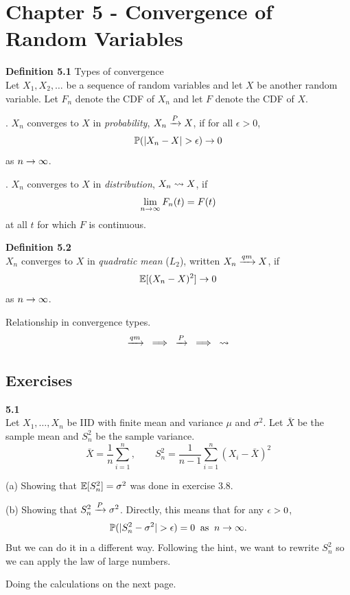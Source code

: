 
\newpage
\section{Chapter 5 - Convergence of Random Variables}

\medskip\noindent\textbf{Definition 5.1} Types of convergence\\
Let $X_1,X_2,\ldots$ be a sequence of random variables and let $X$ be another
random variable. Let $F_n$ denote the CDF of $X_n$ and let $F$ denote the CDF of $X$.

\medskip{}. $X_n$ converges to $X$ in \emph{probability}, $X_n\xrightarrow{P} X$, if for all $\epsilon > 0$,
$$
\mathbb{P}(|X_n - X| > \epsilon)\rightarrow 0
$$
as $n\rightarrow\infty$.

\medskip{}. $X_n$ converges to $X$ in \emph{distribution}, $X_n\rightsquigarrow X$, if
$$
\lim_{n\rightarrow\infty}F_n(t) = F(t)
$$
at all $t$ for which $F$ is continuous.

\medskip\noindent\textbf{Definition 5.2}\\
$X_n$ converges to $X$ in \emph{quadratic mean} ($L_2$), written $X_n\xrightarrow{qm} X$, if
$$
\mathbb{E}[(X_n - X)^2]\rightarrow 0
$$
as $n\rightarrow\infty$.

\medskip\noindent
Relationship in convergence types.
$$
\xrightarrow{qm} \;\;\implies\;\; \xrightarrow{P} \;\;\implies\;\; \rightsquigarrow
$$

\subsection*{Exercises}
\textbf{5.1}\\  %
Let $X_1,\ldots, X_n$ be IID with finite mean and variance $\mu$ and $\sigma^2$.
Let $\bar{X}$ be the sample mean and $S_n^2$ be the sample variance.
$$
\bar{X} = \frac{1}{n}\sum_{i=1}^n,
\qquad
S_n^2 = \frac{1}{n-1}\sum_{i=1}^n(X_i - \bar{X})^2
$$

\medskip\noindent(a) Showing that $\mathbb{E}[S_n^2] = \sigma^2$ was done in exercise 3.8.

\medskip\noindent(b) Showing that $S_n^2\xrightarrow{P}\sigma^2$. Directly, this means that for any $\epsilon>0$,
$$
\mathbb{P}(|S_n^2 - \sigma^2| > \epsilon) = 0 \;\;\text{as}\;\; n\rightarrow\infty.
$$
But we can do it in a different way. Following the hint, we want to rewrite $S_n^2$
so we can apply the law of large numbers.

\medskip\noindent
Doing the calculations on the next page.

